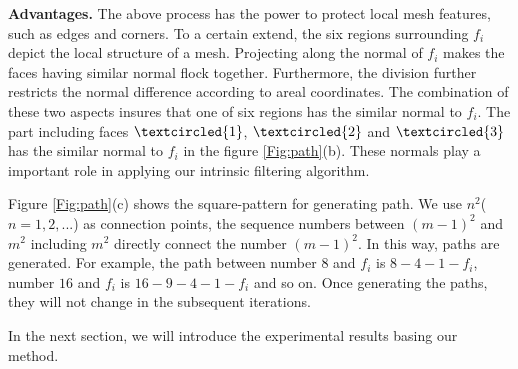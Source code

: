 {\bfseries Advantages.}
 The above process has the power to protect local mesh features, such as edges and corners.
 To a certain extend, the six regions surrounding $f_i$ depict the local structure of a mesh.
 Projecting along the normal of $f_i$ makes the faces having similar normal flock together.
 Furthermore, the division further restricts the normal difference according to areal coordinates.
 The combination of these two aspects insures that one of six regions has the similar normal to $f_i$.
 The part including faces $\textcircled{1}$, $\textcircled{2}$ and $\textcircled{3}$ has the similar normal to $f_i$ in the figure \ref{Fig:path}(b).
 These normals play a important role in applying our intrinsic filtering algorithm.

 Figure \ref{Fig:path}(c) shows the square-pattern for generating path.
 We use $n^2$($ n = 1, 2,...$) as connection points, the sequence numbers between $(m-1)^2$ and $m^2$ including $m^2$ directly connect the number $(m-1)^2$.
 In this way, paths are generated.
 For example, the path between number $8$ and $f_i$ is $8-4-1-f_i$, number $16$ and $f_i$ is $16-9-4-1-f_i$ and so on.
 Once generating the paths, they will not change in the subsequent iterations.

 In the next section, we will introduce the experimental results basing our method.
